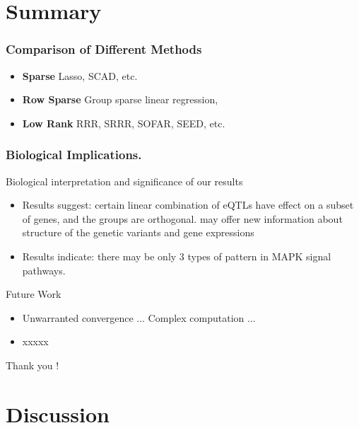 \section{Summary}
\begin{frame}
\sectionpage
\end{frame}

\begin{frame}
    \frametitle{Comparison of Different Methods}
    \begin{itemize}
        \item \textbf{Sparse} Lasso, SCAD, etc.
        \item \textbf{Row Sparse} Group sparse linear regression,  
        \item \textbf{Low Rank} RRR, SRRR, SOFAR, SEED, etc.
    \end{itemize}
\end{frame}

\begin{frame}
    \frametitle{Biological Implications.}
    \begin{block}{Biological interpretation and significance of our results}
        \begin{itemize}
            \item Results suggest:
            certain linear combination of eQTLs have effect on a subset of genes, and the groups are orthogonal. 
            may offer new information about structure of the genetic variants and gene expressions
            \item Results indicate:
            there may be only $3$ types of pattern in MAPK signal pathways. 
        \end{itemize}
    \end{block}
\end{frame}

\begin{frame}
    \begin{block}{Future Work}
        \begin{itemize}
            \item Unwarranted convergence ... Complex computation ... 
            \item xxxxx
        \end{itemize}
    \end{block}


    \vspace{24pt}
    \begin{flushright}
        Thank you !
    \end{flushright}
\end{frame}


\section*{Discussion}
\begin{frame}    
    \sectionpage
\end{frame}